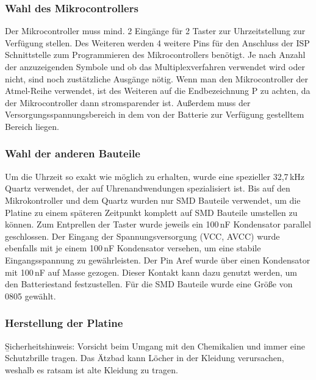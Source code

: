 \subsubsection{Wahl des Mikrocontrollers}
Der Mikrocontroller muss mind. 2 Eingänge für 2 Taster zur Uhrzeitstellung zur Verfügung stellen. Des Weiteren werden 4 weitere Pins für den Anschluss der ISP Schnittstelle zum Programmieren des Mikrocontrollers benötigt. Je nach Anzahl der anzuzeigenden Symbole und ob das Multiplexverfahren verwendet wird oder nicht,  sind noch zustätzliche Ausgänge nötig. Wenn man den Mikrocontroller der Atmel-Reihe verwendet, ist des Weiteren auf die Endbezeichnung {\quote P} zu achten, da der Mikrocontroller dann stromsparender ist. Außerdem muss der Versorgungsspannungsbereich in dem von der Batterie zur Verfügung gestelltem Bereich liegen.

\subsubsection{Wahl der anderen Bauteile}
Um die Uhrzeit so exakt wie möglich zu erhalten, wurde eine spezieller 32,7\,kHz Quartz verwendet, der auf Uhrenandwendungen spezialisiert ist. Bis auf den Mikrokontroller und dem Quartz wurden nur SMD Bauteile verwendet, um die Platine zu einem späteren Zeitpunkt komplett auf SMD Bauteile umstellen zu können. Zum Entprellen der Taster wurde jeweils ein 100\,nF Kondensator parallel geschlossen. Der Eingang der Spannungsversorgung (VCC, AVCC) wurde ebenfalls mit je einem 100\,nF Kondensator versehen, um eine stabile Eingangsspannung zu gewährleisten. Der Pin Aref wurde über einen Kondensator mit 100\,nF auf Masse gezogen. Dieser Kontakt kann dazu genutzt werden, um den Batteriestand festzustellen. Für die SMD Bauteile wurde eine Größe von 0805 gewählt.

\subsubsection{Herstellung der Platine}
\b{Sicherheitshinweis:} 
Vorsicht beim Umgang mit den Chemikalien und immer eine Schutzbrille tragen. Das Ätzbad kann Löcher in der Kleidung verursachen, weshalb es ratsam ist alte Kleidung zu tragen.


